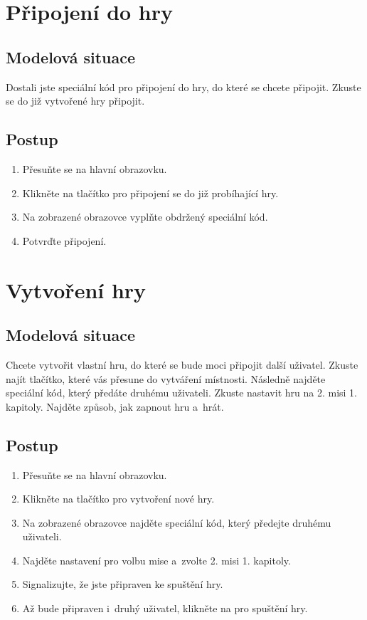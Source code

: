 \section{Připojení do hry}
\label{scen:join}

\subsection*{Modelová situace}

Dostali jste speciální kód pro připojení do hry,
do které se chcete připojit.
Zkuste se do již vytvořené hry připojit.

\subsection*{Postup}

\begin{enumerate}
    \item Přesuňte se na hlavní obrazovku.
    \item Klikněte na tlačítko pro připojení se do již probíhající hry.
    \item Na zobrazené obrazovce vyplňte obdržený speciální kód.
    \item Potvrďte připojení.
\end{enumerate}

\section{Vytvoření hry}
\label{scen:create}

\subsection*{Modelová situace}

Chcete vytvořit vlastní hru,
do které se bude moci připojit další uživatel.
Zkuste najít tlačítko,
které vás přesune do vytváření místnosti.
Následně najděte speciální kód,
který předáte druhému uživateli.
Zkuste nastavit hru na 2. misi 1. kapitoly.
Najděte způsob, jak zapnout hru a~hrát.

\subsection*{Postup}

\begin{enumerate}
    \item Přesuňte se na hlavní obrazovku.
    \item Klikněte na tlačítko pro vytvoření nové hry.
    \item Na zobrazené obrazovce najděte speciální kód,
    který předejte druhému uživateli.
    \item Najděte nastavení pro volbu mise a~zvolte 2. misi 1. kapitoly.
    \item Signalizujte, že jste připraven ke spuštění hry.
    \item Až bude připraven i~druhý uživatel,
    klikněte na pro spuštění hry.
\end{enumerate}

